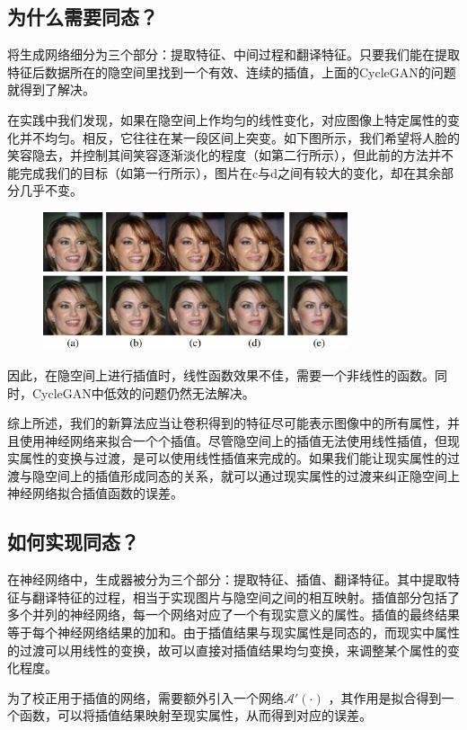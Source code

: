 \documentclass[UTF8,a4paper，12pt]{article}
\def\MC {\mathcal}
\theoremstyle{theorem}
\theoremstyle{definition}
\begin{document}
\subsection{为什么需要同态？}

将生成网络细分为三个部分：提取特征、中间过程和翻译特征。只要我们能在提取特征后数据所在的隐空间里找到一个有效、连续的插值，上面的CycleGAN的问题就得到了解决。

在实践中我们发现，如果在隐空间上作均匀的线性变化，对应图像上特定属性的变化并不均匀。相反，它往往在某一段区间上突变。如下图所示，我们希望将人脸的笑容隐去，并控制其间笑容逐渐淡化的程度（如第二行所示），但此前的方法并不能完成我们的目标（如第一行所示），图片在c与d之间有较大的变化，却在其余部分几乎不变。

\begin{figure}[htbp]
	\centering
	\includegraphics[width=0.8\textwidth]{assets/09}
	\caption{}
\end{figure}
因此，在隐空间上进行插值时，线性函数效果不佳，需要一个非线性的函数。同时，CycleGAN中低效的问题仍然无法解决。

综上所述，我们的新算法应当让卷积得到的特征尽可能表示图像中的所有属性，并且使用神经网络来拟合一个个插值。尽管隐空间上的插值无法使用线性插值，但现实属性的变换与过渡，是可以使用线性插值来完成的。如果我们能让现实属性的过渡与隐空间上的插值形成同态的关系，就可以通过现实属性的过渡来纠正隐空间上神经网络拟合插值函数的误差。

\subsection{如何实现同态？}

在神经网络中，生成器被分为三个部分：提取特征、插值、翻译特征。其中提取特征与翻译特征的过程，相当于实现图片与隐空间之间的相互映射。插值部分包括了多个并列的神经网络，每一个网络对应了一个有现实意义的属性。插值的最终结果等于每个神经网络结果的加和。由于插值结果与现实属性是同态的，而现实中属性的过渡可以用线性的变换，故可以直接对插值结果均匀变换，来调整某个属性的变化程度。

为了校正用于插值的网络，需要额外引入一个网络$\MC A'(\cdot)$ ，其作用是拟合得到一个函数，可以将插值结果映射至现实属性，从而得到对应的误差。
\end{document}

